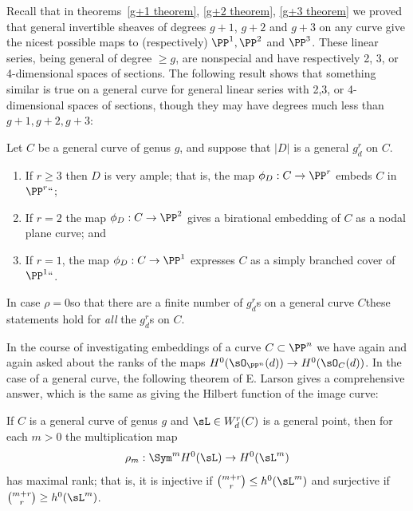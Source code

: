 Recall that  in theorems~\ref{g+1 theorem}, \ref{g+2 theorem}, \ref{g+3
theorem} we proved that
general invertible sheaves of degrees $g+1$, $g+2$ and $g+3$ on any curve
give the nicest possible maps to (respectively) $\PP^1, \PP^2$ and
$\PP^3$. These
linear series, being general of degree $\geq g$, are  nonspecial and
have respectively
2, 3, or 4-dimensional spaces of sections. The following result shows
that something
similar is true on a general curve for general linear series with 2,3,
or 4-dimensional
spaces of sections, though they may have degrees much less than $g+1,
g+2, g+3$:

\begin{npt}
\begin{theorem}
\label{grd omnibus}
Let $C$ be a general curve of genus $g$, and suppose that
$|D|$ is a general $g^r_d$ on $C$.

 \begin{enumerate}
\item If $r \geq 3$ then $D$ is very ample; that is, the map $\phi_D :
C \to \PP^r$   embeds $C$ in $\PP^r` `$;
\item If $r=2$ the map $\phi_D : C \to \PP^2$ gives a birational embedding
of $C$ as a nodal plane curve; and
\item If $r=1$, the map $\phi_D : C \to \PP^1$ expresses $C$ as a simply
branched cover of $\PP^1` `$.
\end{enumerate}
\end{theorem}
\end{npt}

In case $\rho = 0$\emdash so that there are a finite number of $g^r_d$s
on a general curve $C$\emdash these statements hold for \emph{all}
the $g^r_d$s on $C$.

In the course of investigating embeddings of a curve $C\subset \PP^n$
we have again and again
asked about the ranks of the maps $H^0(\sO_{\PP^n}(d)) \to
H^0(\sO_C(d))$. In the case of
a general curve, the following theorem of
E. Larson
%
gives a
comprehensive answer,
which is the same as giving
 the Hilbert function of the image curve:

\begin{theorem}\label{maximal rank}
If $C$ is a general curve of genus $g$ and $\sL  \in W^r_d(C)$ is a
%
general point, then for each $m > 0$ the multiplication map
$$
\rho_m : \Sym^m H^0(\sL ) \to H^0(\sL ^m)
$$
has maximal rank; that is, it is injective if $\tbinom{m+r}{r} \leq
h^0(\sL ^m)$ and surjective if $\tbinom{m+r}{r} \geq h^0(\sL ^m)$.
\end{theorem}


